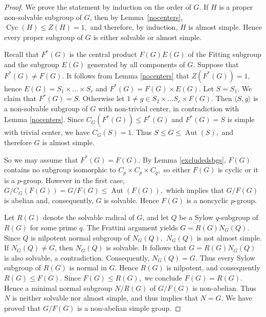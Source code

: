 \documentclass[preprint,11pt]{elsarticle}
\newcommand{\cyc}{\operatorname{Cyc}}
\newcommand{\aut}{\operatorname{Aut}}
\begin{document}
\begin{proof}
	We prove the statement by induction on the order of $G$. If $H$ is a proper non-solvable subgroup of $G$, then  by Lemma~\ref{nocenters}, $\cyc(H)\leq Z(H)=1,$ and therefore, by induction, $H$ is almost simple. Hence every proper subgroup of $G$ is either solvable or almost simple.

Recall that $F^*(G)$ is the central product 	$F(G)E(G)$ of the Fitting subgroup and the subgroup $E(G)$  generated by
all components of $G.$ Suppose that $F^*(G)\neq F(G).$ It follows from Lemma \ref{nocenters} that $Z(F^*(G))=1,$ hence $E(G)=S_1\times \dots \times S_r$ and $F^*(G)=F(G)\times E(G).$ Let $S=S_1.$ We claim that $F^*(G)=S.$ Otherwise let $1\neq g \in S_2\times \dots S_r\times F(G).$
Then $\langle S, g\rangle$ is a non-solvable subgroup of $G$ with non-trivial center, in contradiction with Lemma \ref{nocenters}.
Since $C_G(F^*(G))\leq F^*(G)$ and $F^*(G)=S$ is simple with trivial center, we have $C_G(S)=1$. Thus
$S\leq G\leq \operatorname{Aut}(S),$
and therefore $G$ is almost simple.

So we may assume that  $F^*(G)=F(G).$
By Lemma \ref{excludedsbgs}, $F(G)$ contains no subgroup isomorphic to $C_p\times C_p \times C_q,$ so either $F(G)$ is cyclic or it is a $p$-group. However in the first case, $G/C_G(F(G))=G/F(G) \leq \aut(F(G)),$ which implies that $G/F(G)$ is abelian and, consequently, $G$ is solvable.  Hence $F(G)$ is a noncyclic $p$-group. 

Let $R(G)$ denote the solvable radical of $G$, and let $Q$ be a Sylow $q$-subgroup of $R(G)$ for some prime $q$. The Frattini argument yields
$G=R(G)N_G(Q).$ Since $Q$ is nilpotent normal subgroup of $N_G(Q),$ $N_G(Q)$ is not almost simple.  If $N_G(Q)\neq G$, then $N_G(Q)$ is solvable. It follows that
$G=R(G)N_G(Q)$ is also solvable, a contradiction. Consequently,
$N_G(Q)=G.$
Thus every Sylow subgroup of $R(G)$ is normal in $G$. Hence $R(G)$ is nilpotent, and consequently $R(G)\leq F(G).$ Since $F(G)\leq R(G),$ we conclude $F(G)=R(G).$ Hence a minimal normal subgroup  $N/R(G)$ of $G/F(G)$ is non-abelian. Thus $N$ is neither solvable nor almost simple, and thus implies that $N=G.$ We have proved that $G/F(G)$ is a non-abelian simple group. 


\end{proof}
\end{document}
